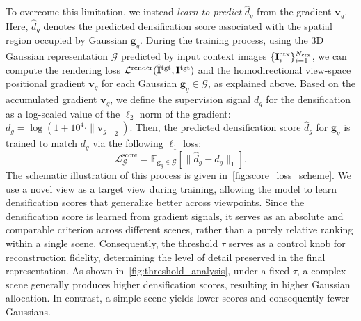 To overcome this limitation, we instead \textit{learn to predict} $\hat{d}_g$ from the gradient $\mathbf{v}_g$. Here, $\hat{d}_g$ denotes the predicted densification score associated with the spatial region occupied by Gaussian $\mathbf{g}_g$. During the training process, using the 3D Gaussian representation $\mathcal{G}$ predicted by input context images $\{\mathbf{I}^{\text{ctx}}_i\}^{N_{\text{ctx}}}_{i=1}$, we can compute the rendering loss $\mathcal{L}^{\text{render}}(\hat{\mathbf{I}}^{\text{tgt}},\mathbf{I}^{\text{tgt}})$ and the homodirectional view-space positional gradient $\mathbf{v}_g$ for each Gaussian $\mathbf{g}_g\in\mathcal{G}$, as explained above. Based on the accumulated gradient $\mathbf{v}_g$, we define the supervision signal $d_g$ for the densification as a log-scaled value of the $\ell_2$ norm of the gradient: $d_g \!=\! \log\left(1+10^4\cdot \|\mathbf{v}_g\|_2\right)$. Then, the predicted densification score $\hat{d}_g$ for $\mathbf{g}_g$ is trained to match $d_g$ via the following $\ell_1$ loss:
\begin{equation}
    \mathcal{L}^{\text{score}}_\mathcal{G} = \mathbb{E}_{\mathbf{g}_g \in \mathcal{G}} \left[\|\hat{d}_g - d_g\|_1\right].
\end{equation}
The schematic illustration of this process is given in~\cref{fig:score_loss_scheme}. We use a novel view as a target view during training, allowing the model to learn densification scores that generalize better across viewpoints. Since the densification score is learned from gradient signals, it serves as an absolute and comparable criterion across different scenes, rather than a purely relative ranking within a single scene. Consequently, the threshold $\tau$ serves as a control knob for reconstruction fidelity, determining the level of detail preserved in the final representation. As shown in~\cref{fig:threshold_analysis}, under a fixed $\tau$, a complex scene generally produces higher densification scores, resulting in higher Gaussian allocation. In contrast, a simple scene yields lower scores and consequently fewer Gaussians. 

